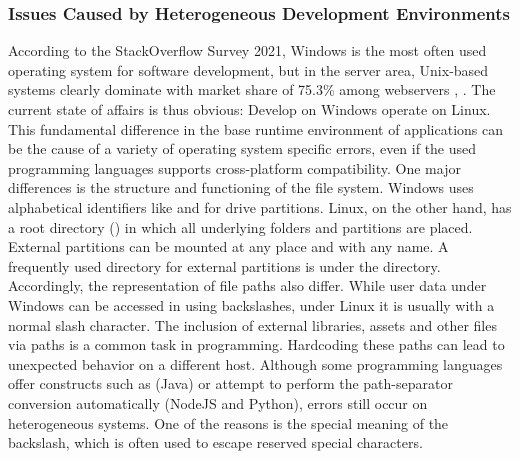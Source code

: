         \subsubsection{Issues Caused by Heterogeneous Development Environments}\label{sss::hetero}
        According to the StackOverflow Survey 2021, Windows is the most often used operating system for software development, but in the server area, Unix-based systems clearly dominate with market share of 75.3\% among webservers \cite{stackoverflow2021}, \cite{unixusage}. The current state of affairs is thus obvious: Develop on Windows operate on Linux. This fundamental difference in the base runtime environment of applications can be the cause of a variety of operating system specific errors, even if the used programming languages supports cross-platform compatibility. One major differences is the structure and functioning of the file system. Windows uses alphabetical identifiers like  and  for drive partitions. Linux, on the other hand, has a root directory (\code{/}) in which all underlying folders and partitions are placed. External partitions can be mounted at any place and with any name. A frequently used directory for external partitions is under the  directory. Accordingly, the representation of file paths also differ. While user data under Windows can be accessed in  using backslashes, under Linux it is usually  with a normal slash character. The inclusion of external libraries, assets and other files via paths is a common task in programming. Hardcoding these paths can lead to unexpected behavior on a different host. Although some programming languages offer constructs such as  (Java) or attempt to perform the path-separator conversion automatically (NodeJS and Python), errors still occur on heterogeneous systems. One of the reasons is the special meaning of the backslash, which is often used to escape reserved special characters.\newline
